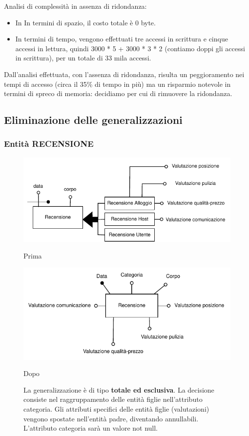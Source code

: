 Analisi di complessità in assenza di ridondanza:
\begin{itemize}
      \item In In termini di spazio, il costo totale è 0 byte.
      \item In termini di tempo, vengono effettuati tre accessi in scrittura e cinque accessi in lettura, quindi 3000 * 5 + 3000 * 3 * 2 (contiamo doppi gli accessi in scrittura), per un totale di 33 mila accessi.
\end{itemize}

Dall'analisi effettuata, con l'assenza di ridondanza, risulta un peggioramento nei tempi di accesso (circa il 35\% di tempo in più) ma un risparmio notevole in termini di spreco di memoria: decidiamo per cui di rimuovere la ridondanza.

\subsection{Eliminazione delle generalizzazioni}
\subsubsection{Entità RECENSIONE}
\begin{figure}[H]
      \centering
      \begin{minipage}[b]{0.45\textwidth}
            \includegraphics[width=\textwidth]{resources/pdf/page7.pdf}
            \caption{Prima}
      \end{minipage}
      \hfill
      \begin{minipage}[b]{0.45\textwidth}
            \includegraphics[width=\textwidth]{resources/pdf/page8.pdf}
            \caption{Dopo}
      \end{minipage}
      \caption*{La generalizzazione è di tipo \textbf{totale ed esclusiva}. La decisione consiste nel raggruppamento delle entità	figlie nell'attributo categoria. Gli attributi specifici delle entità figlie (valutazioni) vengono spostate nell'entità padre, diventando annullabili. L'attributo categoria sarà un valore not null.}
\end{figure}

